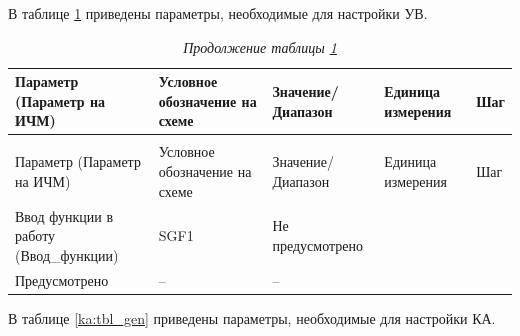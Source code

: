 \par
В таблице \ref{uv:tbl_gen} приведены параметры, необходимые для настройки УВ. 

\footnotesize
\begin{longtable}{|>{\centering\arraybackslash}m{5.3cm}|>{\centering\arraybackslash}m{3.3cm}|>{\centering\arraybackslash}m{4.2cm}|>{\centering\arraybackslash}m{1.8cm}|>{\centering\arraybackslash}m{1cm}|}
\caption{Параметры для настройки УВ\hfill\vspace{-0.5\baselineskip}}\label{uv:tbl_gen}\\ 
\hline
\rowcolor{unimain!40}
Параметр (Параметр на ИЧМ) & Условное обозначение на схеме & Значение/ Диапазон & Единица измерения & Шаг \\ 
\hline
\endfirsthead
\caption*{\hspace{3pt}\emph{Продолжение таблицы \ref{uv:tbl_gen}\hfill\vspace{-0.5\baselineskip}}} \\ %
\hline
\rowcolor{unimain!40}
Параметр (Параметр на ИЧМ) & Условное обозначение на схеме & Значение/ Диапазон & Единица измерения & Шаг \\ 
\endhead
\endfoot
\endlastfoot
\centering Ввод функции в работу (Ввод\_функции)  & \centering SGF1 & \centering Не предусмотрено \\ Предусмотрено & \centering -- & \centering \arraybackslash -- \\
\hline
\end{longtable}
\normalsize


\par
В таблице \ref{ka:tbl_gen} приведены параметры, необходимые для настройки КА.

